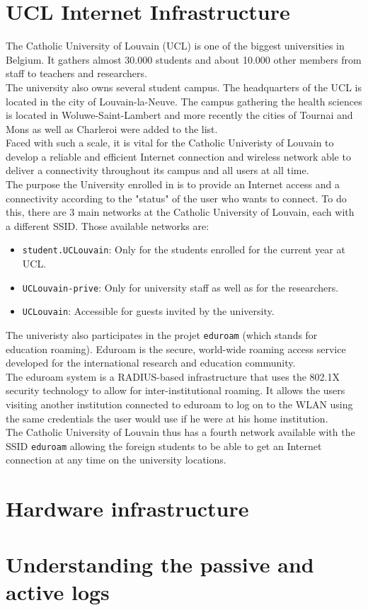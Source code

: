 \section{UCL Internet Infrastructure}
The Catholic University of Louvain (UCL) is one of the biggest universities in Belgium. It gathers almost 30.000 students and about 10.000 other members from staff to teachers and researchers.\\
The university also owns several student campus. The headquarters of the UCL is located in the city of Louvain-la-Neuve. The campus gathering the health sciences is located in Woluwe-Saint-Lambert and more recently the cities of Tournai and Mons as well as Charleroi were added to the list.\\
Faced with such a scale, it is vital for the Catholic Univeristy of Louvain to develop a reliable and efficient Internet connection and wireless network able to deliver a connectivity throughout its campus and all users at all time.\\
The purpose the University enrolled in is to provide an Internet access and a connectivity according to the "status" of the user who wants to connect. To do this, there are 3 main networks at the Catholic University of Louvain, each with a different SSID. Those available networks are:
\begin{itemize}
	\item \texttt{student.UCLouvain}: Only for the students enrolled for the current year at UCL.
	\item \texttt{UCLouvain-prive}: Only for university staff as well as for the researchers.
	\item \texttt{UCLouvain}: Accessible for guests invited by the university.
\end{itemize}
The univeristy also participates in the projet \texttt{eduroam} (which stands for education roaming). Eduroam is the secure, world-wide roaming access service developed for the international research and education community\cite{eduroam1}.\\
The eduroam system is a RADIUS-based infrastructure that uses the 802.1X security technology to allow for inter-institutional roaming. It allows the users visiting another institution connected to eduroam to log on to the WLAN using the same credentials the user would use if he were at his home institution\cite{eduroam2}.\\
The Catholic University of Louvain thus has a fourth network available with the SSID \texttt{eduroam} allowing the foreign students to be able to get an Internet connection at any time on the university locations.



\section{Hardware infrastructure}


\section{Understanding the passive and active logs}
